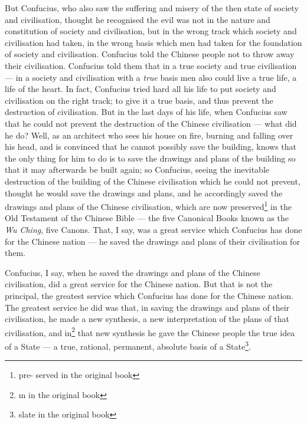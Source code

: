 But Confucius, who also saw the suffering and misery of the then state of society and civilisation, thought he recognised the evil was not in the nature and constitution of society and civilisation, but in the wrong track which society and civilisation had taken, in the wrong basis which men had taken for the foundation of society and civilisation.
Confucius told the Chinese people not to throw away their civilisation.
Confucius told them that in a true society and true civilisation --- in a society and civilisation with a \emph{true} basis men also could live a true life, a life of the heart.
In fact, Confucius tried hard all his life to put society and civilisation on the right track; to give it a true basis, and thus prevent the destruction of civilisation.
But in the last days of his life, when Confucius saw that he could not prevent the destruction of the Chinese civilisation --- what did he do?
Well, as an architect who sees his house on fire, burning and falling over his head, and is convinced that he cannot possibly save the building, knows that the only thing for him to do is to save the drawings and plans of the building so that it may afterwards be built again;
so Confucius, seeing the inevitable destruction of the building of the Chinese civilisation which he could not prevent, thought he would save the drawings and plans, and he accordingly saved the drawings and plans of the Chinese civilisation, which are now preserved\footnote{pre- served in the original book} in the Old Testament of the Chinese Bible --- the five Canonical Books known as the \emph{Wu Ching}, five Canons.
That, I say, was a great service which Confucius has done for the Chinese nation --- he saved the drawings and plans of their civilisation for them.

Confucius, I say, when he saved the drawings and plans of the Chinese civilisation, did a great service for the Chinese nation.
But that is not the principal, the greatest service which Confucius has done for the Chinese nation.
The greatest service he did was that, in saving the drawings and plans of their civilisation, he made a new synthesis, a new interpretation of the plans of that civilisation, and in\footnote{m in the original book} that new synthesis he gave the Chinese people the true idea of a State --- a true, rational, permanent, absolute basis of a State\footnote{slate in the original book}.

